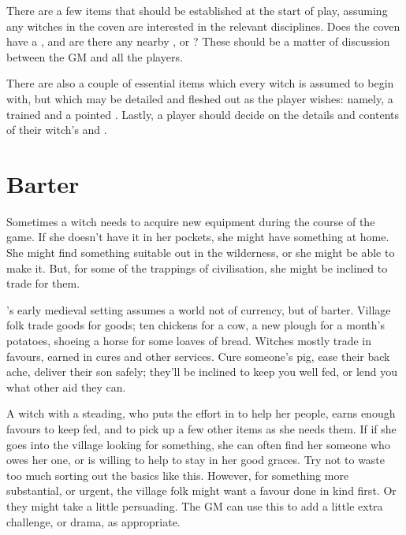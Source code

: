 There are a few items that should be established at the start of play, assuming any witches in the coven are interested in the relevant disciplines.
Does the coven have a , and are there any nearby , or ?
These should be a matter of discussion between the GM and all the players.

There are also a couple of essential items which every witch is assumed to begin with, but which may be detailed and fleshed out as the player wishes: namely, a trained  and a pointed {\hat}.
Lastly, a player should decide on the details and contents of their witch's  and .



\section{Barter}

Sometimes a witch needs to acquire new equipment during the course of the game.
If she doesn't have it in her pockets, she might have something at home.
She might find something suitable out in the wilderness, or she might be able to make it.
But, for some of the trappings of civilisation, she might be inclined to trade for them.

's early medieval setting assumes a world not of currency, but of barter.
Village folk trade goods for goods; ten chickens for a cow, a new plough for a month's potatoes, shoeing a horse for some loaves of bread.
Witches mostly trade in favours, earned in cures and other services.
Cure someone's pig, ease their back ache, deliver their son safely; they'll be inclined to keep you well fed, or lend you what other aid they can.

A witch with a steading, who puts the effort in to help her people, earns enough favours to keep fed, and to pick up a few other items as she needs them.
If if she goes into the village looking for something, she can often find her someone who owes her one, or is willing to help to stay in her good graces.
Try not to waste too much sorting out the basics like this.
However, for something more substantial, or urgent, the village folk might want a favour done in kind first.
Or they might take a little persuading.
The GM can use this to add a little extra challenge, or drama, as appropriate.



